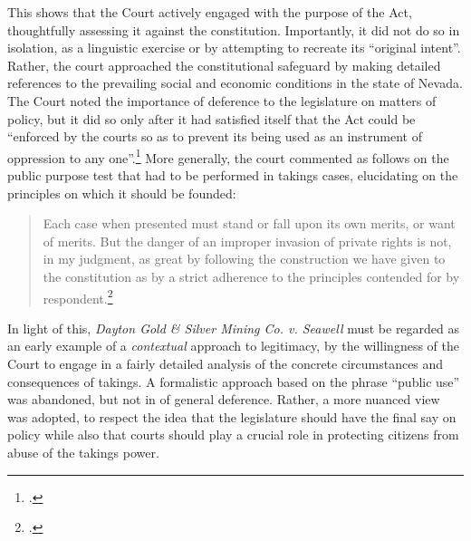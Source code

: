 This shows that the Court actively engaged with the purpose of the Act, thoughtfully assessing it against the constitution. Importantly, it did not do so in isolation, as a linguistic exercise or by attempting to recreate its ``original intent''. Rather, the court approached the constitutional safeguard by making detailed references to the prevailing social and economic conditions in the state of Nevada. The Court noted the importance of deference to the legislature on matters of policy, but it did so only after it had satisfied itself that the Act could be ``enforced by the courts so as to prevent its being used as an instrument of oppression to any one''.\footcite[412]{seawell76} More generally, the court commented as follows on the public purpose test that had to be performed in takings cases, elucidating on the principles on which it should be founded:

\begin{quote}
 Each case when presented must stand or fall upon its own merits, or want of merits. But the danger of an improper invasion of private rights is not, in my judgment, as great by following the construction we have given to the constitution as by a strict adherence to the principles contended for by respondent.\footcite[398]{seawell76}
\end{quote}

In light of this, {\it Dayton Gold \& Silver Mining Co. v. Seawell} must be regarded as an early example of a {\it contextual} approach to legitimacy,  by the willingness of the Court to engage in a fairly detailed analysis of the concrete circumstances and consequences of takings. A formalistic approach based on the phrase ``public use'' was abandoned, but not in  of general deference. Rather, a more nuanced view was adopted, to respect the idea that the legislature should have the final say on policy while also  that courts should play a crucial role in protecting citizens from abuse of the takings power. 


